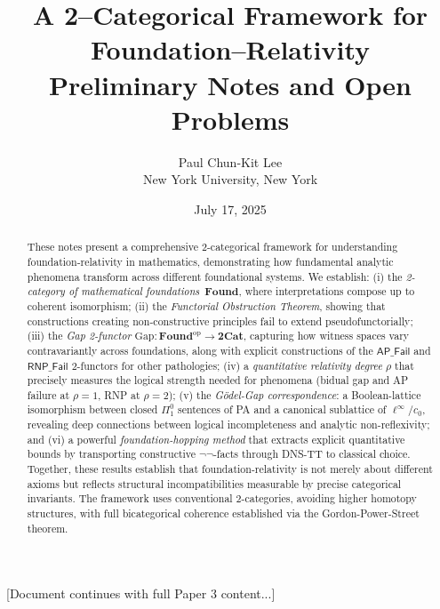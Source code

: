 \documentclass[11pt]{article}
\title{A 2--Categorical Framework for Foundation--Relativity\\
  \large{Preliminary Notes and Open Problems}}
\author{Paul Chun-Kit Lee\\
  \small New York University, New York}
\date{July 17, 2025}
\theoremstyle{definition}
\theoremstyle{remark}
\begin{document}
\maketitle
\thispagestyle{empty}

\begin{abstract}
  These notes present a comprehensive 2-categorical framework for understanding
  foundation-relativity in mathematics, demonstrating how fundamental analytic
  phenomena transform across different foundational systems. We establish:
  (i) the \emph{2-category of mathematical foundations}~\(\mathbf{Found}\),
  where interpretations compose up to coherent isomorphism;
  (ii) the \emph{Functorial Obstruction Theorem}, showing that constructions
  creating non-constructive principles fail to extend pseudofunctorially;
  (iii) the \emph{Gap 2-functor}
  \(\mathrm{Gap}\colon\mathbf{Found}^{\mathrm{op}}\to\mathbf{2Cat}\),
  capturing how witness spaces vary contravariantly across foundations,
  along with explicit constructions of the \(\mathsf{AP\_Fail}\) and
  \(\mathsf{RNP\_Fail}\) 2-functors for other pathologies;
  (iv) a \emph{quantitative relativity degree} \(\rho\) that precisely
  measures the logical strength needed for phenomena (bidual gap and AP
  failure at \(\rho=1\), RNP at \(\rho=2\));
  (v) the \emph{Gödel-Gap correspondence}: a Boolean-lattice isomorphism 
  between closed \(\Pi^0_1\)
  sentences of PA and a canonical sublattice of \(\ell^\infty/c_0\),
  revealing deep connections between logical incompleteness and analytic
  non-reflexivity; and
  (vi) a powerful \emph{foundation-hopping method} that extracts explicit
  quantitative bounds by transporting constructive
  \(\neg\neg\)-facts
  through DNS-TT to classical choice. 
  Together, these results establish that foundation-relativity is not
  merely about different axioms but reflects structural incompatibilities
  measurable by precise categorical invariants. The framework uses conventional 2-categories, avoiding higher homotopy structures, with full bicategorical coherence established via the Gordon-Power-Street theorem.
\end{abstract}

[Document continues with full Paper 3 content...]
\end{document}

